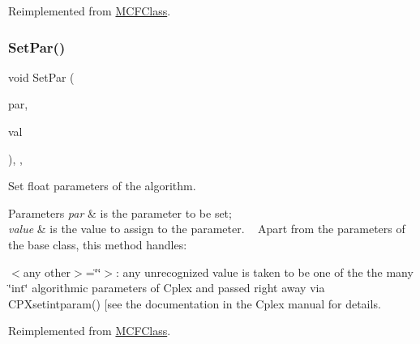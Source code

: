 Reimplemented from \mbox{\hyperlink{class_m_c_f_class_ab8e162715d8454f30679c10372db4db8}{M\+C\+F\+Class}}.

\mbox{\label{class_m_c_f_cplex_a64a55cf140fd8543ab0cf88cc052d8d7}} 
\subsubsection{\texorpdfstring{Set\+Par()}{SetPar()}\hspace{0.1cm}{\footnotesize\ttfamily [2/2]}}
{\footnotesize\ttfamily void Set\+Par (\begin{DoxyParamCaption}\item[{int}]{par,  }\item[{double}]{val }\end{DoxyParamCaption})\hspace{0.3cm}{\ttfamily [inline]}, {\ttfamily [override]}, {\ttfamily [virtual]}}

Set float parameters of the algorithm.


\begin{DoxyParams}{Parameters}
{\em par} & is the parameter to be set;\\
\hline
{\em value} & is the value to assign to the parameter. ~\newline
 Apart from the parameters of the base class, this method handles\+:\\
\hline
\end{DoxyParams}

\begin{DoxyItemize}
\item $<$any other$>$=\char`\"{}\char`\"{}$>$\+: any unrecognized value is taken to be one of the the many \char`\"{}int\char`\"{} algorithmic parameters of Cplex and passed right away via C\+P\+Xsetintparam() \mbox{[}see the documentation in the Cplex manual for details. 
\end{DoxyItemize}

Reimplemented from \mbox{\hyperlink{class_m_c_f_class_a4acd81f913880873c577de03a4fa1959}{M\+C\+F\+Class}}.

\mbox{\label{class_m_c_f_cplex_aea7d742cb19c17b17fb0832ea74cdb21}} 

